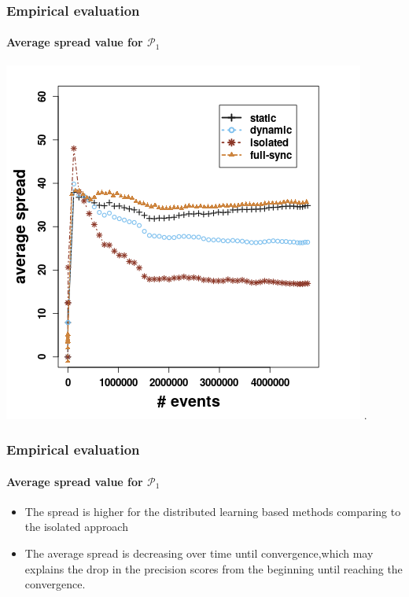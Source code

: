 \begin{frame}
	
	\frametitle{Empirical evaluation }
	\framesubtitle{Average spread value for $\mathcal{P}_1$}
	
	\begin{center}
		\includegraphics[width=.8\textwidth,height=.7\linewidth]{figures/spread_p1.png}
		.
	\end{center}
	
\end{frame}

\begin{frame}
	
	\frametitle{Empirical evaluation }
	\framesubtitle{Average spread value for $\mathcal{P}_1$}
	
\begin{itemize}
	\item<1-> The spread is higher for the distributed learning based methods comparing to the isolated approach
	
	\item<1-> The average spread is decreasing over time until convergence,which may explains the drop in the precision scores from the beginning until reaching the convergence.
	
\end{itemize}
	
\end{frame}




